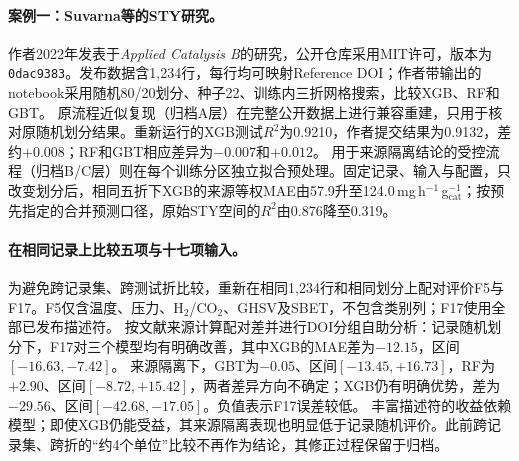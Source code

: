 \documentclass[11pt,a4paper]{article}
\newcommand{\mgg}{\,mg\,h$^{-1}$\,g$_{\mathrm{cat}}^{-1}$}
\begin{document}
\paragraph{案例一：Suvarna等的STY研究。}
作者2022年发表于\emph{Applied Catalysis B}的研究，公开仓库采用MIT许可，版本为\texttt{0dac9383}。发布数据含1,234行，每行均可映射Reference DOI；作者带输出的notebook采用随机80/20划分、种子22、训练内三折网格搜索，比较XGB、RF和GBT。
原流程近似复现（归档A层）在完整公开数据上进行兼容重建，只用于核对原随机划分结果。重新运行的XGB测试$R^2$为0.9210，作者提交结果为0.9132，差约$+0.008$；RF和GBT相应差异为$-0.007$和$+0.012$。
用于来源隔离结论的受控流程（归档B/C层）则在每个训练分区独立拟合预处理。固定记录、输入与配置，只改变划分后，相同五折下XGB的来源等权MAE由57.9升至124.0\mgg{}；按预先指定的合并预测口径，原始STY空间的$R^2$由0.876降至0.319。

\paragraph{在相同记录上比较五项与十七项输入。}
为避免跨记录集、跨测试折比较，重新在相同1,234行和相同划分上配对评价F5与F17。F5仅含温度、压力、H$_2$/CO$_2$、GHSV及SBET，不包含类别列；F17使用全部已发布描述符。
按文献来源计算配对差并进行DOI分组自助分析：记录随机划分下，F17对三个模型均有明确改善，其中XGB的MAE差为$-12.15$，区间$[-16.63,-7.42]$。
来源隔离下，GBT为$-0.05$、区间$[-13.45,+16.73]$，RF为$+2.90$、区间$[-8.72,+15.42]$，两者差异方向不确定；XGB仍有明确优势，差为$-29.56$、区间$[-42.68,-17.05]$。负值表示F17误差较低。
丰富描述符的收益依赖模型；即使XGB仍能受益，其来源隔离表现也明显低于记录随机评价。此前跨记录集、跨折的“约4个单位”比较不再作为结论，其修正过程保留于归档。
\end{document}
